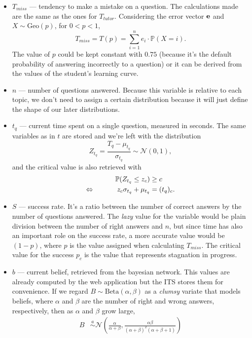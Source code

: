 \documentclass{article}
\newcommand{\0}{\mathbbold{0}}
\newcommand{\1}{\mathds{1}}
\newcommand{\2}{\mathbbold{2}}
\newcommand{\Beta}[2]{\text{Beta}\!\left(#1,#2\right)}
\newcommand{\LRA}{\Leftrightarrow\mkern40mu}
\begin{document}
\begin{itemize} 
    \item $T_\mathit{miss}$ — tendency to make a mistake on a question. The calculations made are the same as the ones for $T_\mathit{tutor}$. Considering the error vector ${\bf e}$ and $X \sim \text{Geo}(p)$, for $0<p<1$,
    $$ T_\mathit{miss} = T(p) = \sum_{i=1}^{n} e_i \cdot \mathbb{P}(X = i). $$
    The value of $p$ could be kept constant with $0.75$ (because it's the default probability of answering incorrectly to a question) or it can be derived from the values of the student's learning curve.
    \item $n$ — number of questions answered. Because this variable is relative to each topic, we don't need to assign a certain distribution because it will just define the shape of our later distributions.
    \item $t_q$ — current time spent on a single question, measured in seconds. The same variables as in $t$ are stored and we're left with the distribution
    $$ Z_{t_q} = \frac{T_q-\mu_{t_q}}{\sigma_{t_q}} \sim \mathcal{N}(0,1), $$
    and the critical value is also retrieved with
    \begin{alignat*}{2}
        && \mathbb{P}(Z_{t_q} \le z_c) &\ge c \\
        \LRA && z_c\sigma_{t_q} + \mu_{t_q} &= (t_q)_c.
    \end{alignat*}
    \item $S$ — success rate. It's a ratio between the number of correct answers by the number of questions answered. The \textsl{lazy} value for the variable would be plain division between the number of right answers and $n$, but since time has also an important role on the success rate, a more accurate value would be $(1-p)$, where $p$ is the value assigned when calculating $T_\mathit{miss}$. The critical value for the success $p_c$ is the value that represents stagnation in progress.
    \item $b$ — current belief, retrieved from the bayesian network. This values are already computed by the web application but the ITS stores them for convenience. If we regard $B \sim \Beta{\alpha}{\beta}$ as a \textsl{clumsy} variate that models beliefs, where $\alpha$ and $\beta$ are the number of right and wrong answers, respectively, then as $\alpha$ and $\beta$ grow large,
    \begin{align*}
        B &\overset{a}{\sim} \mathcal{N}\!\left(\frac{\alpha}{\alpha+\beta}, \frac{\alpha\beta}{(\alpha+\beta)^2(\alpha+\beta+1)}\right) \\

\end{align*}
\end{itemize}
\end{document}

